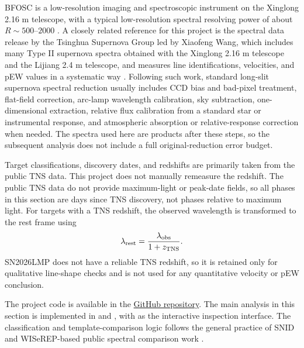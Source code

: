 \documentclass[11pt]{article}
\begin{document}
BFOSC is a low-resolution imaging and spectroscopic instrument on the Xinglong 2.16 m telescope, with a typical low-resolution spectral resolving power of about $R\sim500$--$2000$ \cite{fanXinglong216m2016,zhaoBFOSCEfficiency2018}. A closely related reference for this project is the spectral data release by the Tsinghua Supernova Group led by Xiaofeng Wang, which includes many Type II supernova spectra obtained with the Xinglong 2.16 m telescope and the Lijiang 2.4 m telescope, and measures line identifications, velocities, and pEW values in a systematic way \cite{linSpectralDataRelease2024}. Following such work, standard long-slit supernova spectral reduction usually includes CCD bias and bad-pixel treatment, flat-field correction, arc-lamp wavelength calibration, sky subtraction, one-dimensional extraction, relative flux calibration from a standard star or instrumental response, and atmospheric absorption or relative-response correction when needed. The spectra used here are products after these steps, so the subsequent analysis does not include a full original-reduction error budget.

Target classifications, discovery dates, and redshifts are primarily taken from the public TNS data. This project does not manually remeasure the redshift. The public TNS data do not provide maximum-light or peak-date fields, so all phases in this section are days since TNS discovery, not phases relative to maximum light. For targets with a TNS redshift, the observed wavelength is transformed to the rest frame using
\[
\lambda_{\rm rest}=\frac{\lambda_{\rm obs}}{1+z_{\rm TNS}}.
\]
SN2026LMP does not have a reliable TNS redshift, so it is retained only for qualitative line-shape checks and is not used for any quantitative velocity or pEW conclusion.

The project code is available in the \href{https://github.com/Zzzaurak/obsastro-sn-pipeline}{GitHub repository}. The main analysis in this section is implemented in  and , with  as the interactive inspection interface. The classification and template-comparison logic follows the general practice of SNID and WISeREP-based public spectral comparison work \cite{blondinDeterminingTypeRedshift2007,yaronWISeREPInteractiveSupernova2012}.
\end{document}
